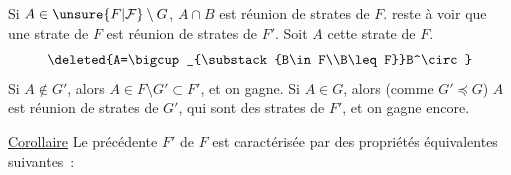 Si $A\in \unsure{F|\mathcal F}\setminus G$, $A\cap B$ est réunion de strates de $F$.  reste à voir que une strate  de $F$ est réunion de strates de $F'$. Soit $A$ cette strate de $F$. 
\[
 \deleted{A=\bigcup_{\substack{B\in F\\B\leq F}}B^\circ}
\]
Si $A\notin G'$, alors $A\in F\setminus G'\subset F'$, et on gagne. Si $A\in G$, alors (comme $G'\preceq G$) $A$ est réunion de strates de $G'$, qui sont des strates de $F'$, et on gagne encore.

\uline{Corollaire} Le  précédente $F'$ de $F$ est caractérisée par  des propriétés équivalentes suivantes~:

